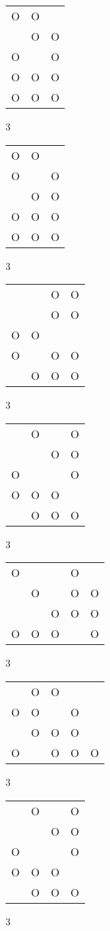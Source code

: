 \begin{tabular}{|m{0.2cm}m{0.2cm}m{0.2cm}|}\hline
O&O& \\
 &O&O\\
O& &O\\
O&O&O\\
O&O&O\\
\hline\end{tabular}3
\begin{tabular}{|m{0.2cm}m{0.2cm}m{0.2cm}|}\hline
O&O& \\
O& &O\\
 &O&O\\
O&O&O\\
O&O&O\\
\hline\end{tabular}3
\begin{tabular}{|m{0.2cm}m{0.2cm}m{0.2cm}m{0.2cm}|}\hline
 & &O&O\\
 & &O&O\\
O&O& & \\
O& &O&O\\
 &O&O&O\\
\hline\end{tabular}3
\begin{tabular}{|m{0.2cm}m{0.2cm}m{0.2cm}m{0.2cm}|}\hline
 &O& &O\\
 & &O&O\\
O& & &O\\
O&O&O& \\
 &O&O&O\\
\hline\end{tabular}3
\begin{tabular}{|m{0.2cm}m{0.2cm}m{0.2cm}m{0.2cm}m{0.2cm}|}\hline
O& & &O& \\
 &O& &O&O\\
 & &O&O&O\\
O&O&O& &O\\
\hline\end{tabular}3
\begin{tabular}{|m{0.2cm}m{0.2cm}m{0.2cm}m{0.2cm}m{0.2cm}|}\hline
 &O&O& & \\
O&O& &O& \\
 &O&O&O& \\
O& &O&O&O\\
\hline\end{tabular}3
\begin{tabular}{|m{0.2cm}m{0.2cm}m{0.2cm}m{0.2cm}|}\hline
 &O& &O\\
 & &O&O\\
O& & &O\\
O&O&O& \\
 &O&O&O\\
\hline\end{tabular}3
